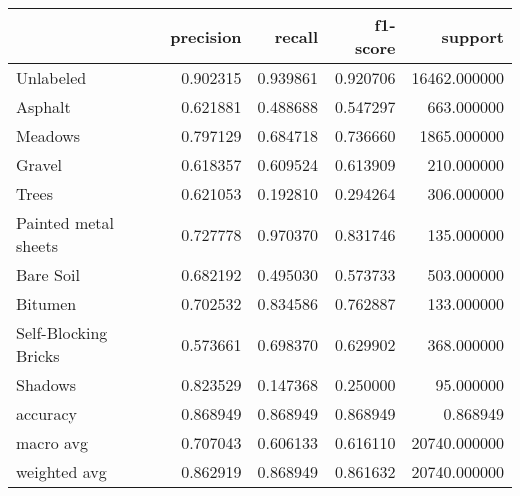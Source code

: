 \begin{tabular}{lrrrr}
\toprule
{} &  precision &    recall &  f1-score &       support \\
\midrule
Unlabeled            &   0.902315 &  0.939861 &  0.920706 &  16462.000000 \\
Asphalt              &   0.621881 &  0.488688 &  0.547297 &    663.000000 \\
Meadows              &   0.797129 &  0.684718 &  0.736660 &   1865.000000 \\
Gravel               &   0.618357 &  0.609524 &  0.613909 &    210.000000 \\
Trees                &   0.621053 &  0.192810 &  0.294264 &    306.000000 \\
Painted metal sheets &   0.727778 &  0.970370 &  0.831746 &    135.000000 \\
Bare Soil            &   0.682192 &  0.495030 &  0.573733 &    503.000000 \\
Bitumen              &   0.702532 &  0.834586 &  0.762887 &    133.000000 \\
Self-Blocking Bricks &   0.573661 &  0.698370 &  0.629902 &    368.000000 \\
Shadows              &   0.823529 &  0.147368 &  0.250000 &     95.000000 \\
accuracy             &   0.868949 &  0.868949 &  0.868949 &      0.868949 \\
macro avg            &   0.707043 &  0.606133 &  0.616110 &  20740.000000 \\
weighted avg         &   0.862919 &  0.868949 &  0.861632 &  20740.000000 \\
\bottomrule
\end{tabular}
